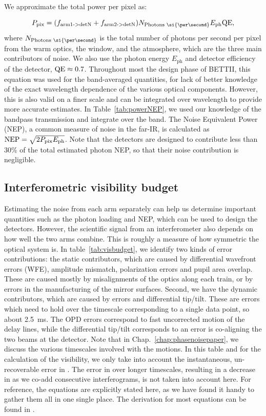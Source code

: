 We approximate the total power per pixel as:

\begin{equation}
P_\textrm{pix} = (f_\textrm{arm1->detN}+ f_\textrm{arm2->detN})N_\textrm{Photons~\si{\per\second}}E_\textrm{ph}\QE,
\end{equation}
where $N_\textrm{Photons~\si{\per\second}}$ is the total number of photons per second per pixel from the warm optics, the window, and the atmosphere, which are the three main contributors of noise. We also use the photon energy $E_\textrm{ph}$ and detector efficiency of the detector, $\textrm{QE}\approx 0.7$. Throughout most the design phase of BETTII, this equation was used for the band-averaged quantities, for lack of better knowledge of the exact wavelength dependence of the various optical components. However, this is also valid on a finer scale and can be integrated over wavelength to provide more accurate estimates. In Table~\ref{tab:powerNEP}, we used our knowledge of the bandpass transmission and integrate over the band. The Noise Equivalent Power (NEP), a common measure of noise in the far-IR, is calculated as $\textrm{NEP} = \sqrt{2P_\textrm{pix}E_\textrm{ph}}$. Note that the detectors are designed to contribute less than 30\% of the total estimated photon NEP, so that their noise contribution is negligible.


\subsection{Interferometric visibility budget}

Estimating the noise from each arm separately can help us determine important quantities such as the photon loading and NEP, which can be used to design the detectors. However, the scientific signal from an interferometer also depends on how well the two arms combine. This is roughly a measure of how symmetric the optical system is. In table~\ref{tab:visbudget}, we identify two kinds of error contributions: the static contributors, which are caused by differential wavefront errors (WFE), amplitude mismatch, polarization errors and pupil area overlap. These are caused mostly by misalignments of the optics along each train, or by errors in the manufacturing of the mirror surfaces. Second, we have the dynamic contributors, which are caused by \OPD errors and differential tip/tilt. These are errors which need to hold over the timescale corresponding to a single data point, so about \SI{2.5}{\milli\second}. The OPD errors correspond to fast uncorrected motion of the delay lines, while the differential tip/tilt corresponds to an error is co-aligning the two beams at the detector. Note that in Chap.~\ref{chap:phasenoisepaper}, we discuss the various timescales involved with the \OPD motions. In this table and for the calculation of the visibility, we only take into account the instantaneous, un-recoverable error in \OPD. The error in \OPD over longer timescales, resulting in a decrease in \SNR as we co-add consecutive interferograms, is not taken into account here. For reference, the equations are explicitly stated here, as we have found it handy to gather them all in one single place. The derivation for most equations can be found in \citet{Lawson:2000vf}.

